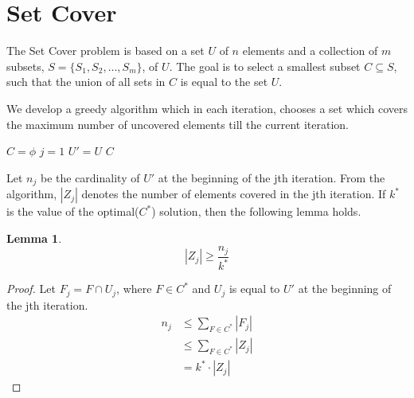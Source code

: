 \documentclass[10pt]{article}
\newtheorem{lemma}[theorem]{Lemma}
\begin{document}
\section{Set Cover}
The Set Cover problem is based on a set $U$ of $n$ elements and a collection of $m$ subsets, $S = \{S_1, S_2, \ldots , S_m\}$, of $U$. The goal is to select a smallest subset $C \subseteq S$, such that the union of all sets in $C$ is equal to the set $U$.

We develop a greedy algorithm which in each iteration, chooses a set which covers the maximum number of uncovered elements till the current iteration.

\begin{algorithm}[H]
\dontprintsemicolon
$C = \phi$ \;
$j = 1$ \;
$U' = U$ \;
\Return $C$
\end{algorithm}

Let $n_j$ be the cardinality of $U'$ at the beginning of the jth iteration. From the algorithm, $|Z_j|$ denotes the number of elements covered in the jth iteration. If $k^*$ is the value of the optimal($C^*$) solution, then the following lemma holds.

\begin{lemma}
$$
|Z_j| \geq \frac{n_j}{k^*}
$$
\end{lemma}
\begin{proof}
Let $F_j = F \cap U_j$, where $F \in C^*$ and $U_j$ is equal to $U'$ at the beginning of the jth iteration.
\begin{align*}
n_j & \leq \displaystyle \sum_{F \in C^*} |F_j| \\
    & \leq \displaystyle \sum_{F \in C^*} |Z_j| \\
    & = k^* \cdot |Z_j|
\end{align*}
\end{proof}
\end{document}
